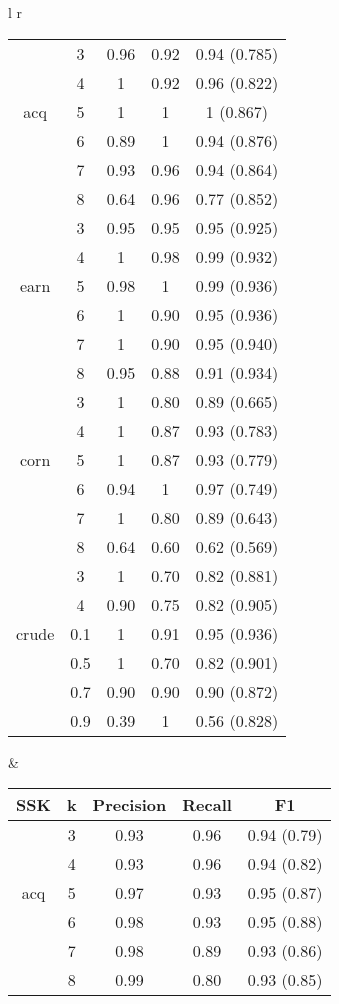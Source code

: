 \begin{tabular}{l r}
\begin{tabular}{| c | c | c | c | c | }
	& 3 & 0.96 & 0.92 & 0.94 (0.785)    \\ 
	& 4 & 1 & 0.92 & 0.96 (0.822)    \\ 
	acq & 5 & 1& 1 &  1 (0.867)   \\
	& 6 & 0.89 & 1 & 0.94 (0.876)    \\ 
	& 7 & 0.93 & 0.96 & 0.94   (0.864)  \\ 
	& 8 & 0.64 & 0.96 & 0.77  (0.852)   \\ \hline
	
	
	& 3 & 0.95 & 0.95 &  0.95  (0.925)  \\	
	& 4 & 1 & 0.98 &  0.99  (0.932)  \\ 
	earn & 5 & 0.98 & 1 &  0.99 (0.936)   \\ 
	& 6 & 1 & 0.90 &  0.95  (0.936)  \\ 
	& 7 & 1 & 0.90 &  0.95  (0.940)  \\
	& 8 & 0.95 & 0.88 &  0.91  (0.934)  \\\hline
	
	
	
	& 3 & 1 & 0.80 & 0.89  (0.665)   \\ 
	& 4 & 1 & 0.87 & 0.93   (0.783)  \\ 
	corn & 5 & 1 & 0.87 & 0.93   (0.779)  \\ 
	& 6 & 0.94 & 1 &  0.97  (0.749) \\ 
	& 7 & 1 & 0.80 & 0.89   (0.643)  \\ 
	& 8 & 0.64 & 0.60 & 0.62  (0.569)   \\ \hline
	
	
	& 3 & 1 & 0.70 &  0.82  (0.881)  \\
	& 4 & 0.90 & 0.75 &  0.82  (0.905)  \\ 
	crude & 0.1 & 1 & 0.91 & 0.95  (0.936)   \\ 
	& 0.5 & 1 & 0.70 &  0.82 (0.901)   \\ 
	& 0.7 & 0.90 & 0.90 &  0.90   (0.872) \\
	& 0.9 & 0.39 & 1 &  0.56  (0.828)  \\\hline
	
	
\end{tabular}

&

\begin{tabular}{| c | c | c | c | c | }
	\hline SSK& k & Precision & Recall & F1   \\ \hline


			
	
	& 3 & 0.93 & 0.96 & 0.94 (0.79)    \\ 
	& 4 & 0.93 & 0.96 &  0.94  (0.82)  \\
	acq	& 5 & 0.97 & 0.93 & 0.95  (0.87)   \\ 
	& 6 & 0.98 & 0.93 & 0.95 (0.88)    \\
	& 7 & 0.98 & 0.89 & 0.93 (0.86)    \\
	& 8 & 0.99 & 0.80 & 0.93  (0.85)   \\\hline
	

\end{tabular}
\end{tabular}
